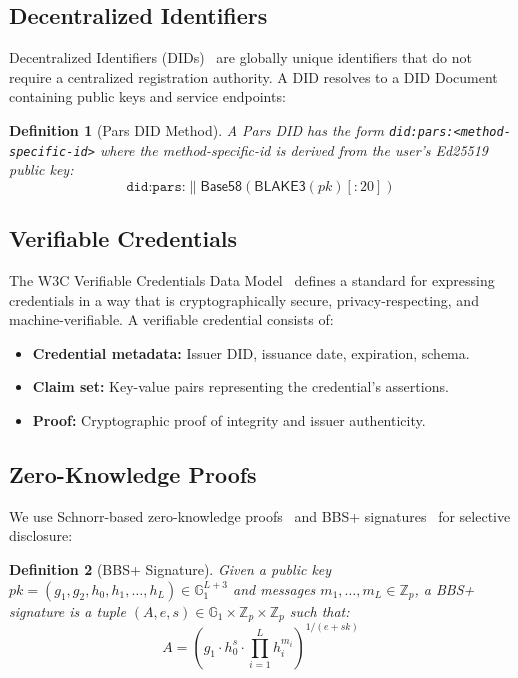 \documentclass[11pt,a4paper]{article}
\newcommand{\GG}{\mathbb{G}}
\newcommand{\ZZ}{\mathbb{Z}}
\newtheorem{definition}{Definition}
\begin{document}
\subsection{Decentralized Identifiers}

Decentralized Identifiers (DIDs)~\citep{w3c2022did} are globally unique identifiers that do not require a centralized registration authority. A DID resolves to a DID Document containing public keys and service endpoints:

\begin{definition}[Pars DID Method]
A Pars DID has the form \texttt{did:pars:<method-specific-id>} where the method-specific-id is derived from the user's Ed25519 public key:
\begin{equation}
    \texttt{did:pars:} \| \mathsf{Base58}(\mathsf{BLAKE3}(pk)[:20])
\end{equation}
\end{definition}

\subsection{Verifiable Credentials}

The W3C Verifiable Credentials Data Model~\citep{w3c2022vc} defines a standard for expressing credentials in a way that is cryptographically secure, privacy-respecting, and machine-verifiable. A verifiable credential consists of:

\begin{itemize}
    \item \textbf{Credential metadata:} Issuer DID, issuance date, expiration, schema.
    \item \textbf{Claim set:} Key-value pairs representing the credential's assertions.
    \item \textbf{Proof:} Cryptographic proof of integrity and issuer authenticity.
\end{itemize}

\subsection{Zero-Knowledge Proofs}

We use Schnorr-based zero-knowledge proofs~\citep{schnorr1991efficient} and BBS+ signatures~\citep{boneh2004bbs} for selective disclosure:

\begin{definition}[BBS+ Signature]
Given a public key $pk = (g_1, g_2, h_0, h_1, \ldots, h_L) \in \GG_1^{L+3}$ and messages $m_1, \ldots, m_L \in \ZZ_p$, a BBS+ signature is a tuple $(A, e, s) \in \GG_1 \times \ZZ_p \times \ZZ_p$ such that:
\begin{equation}
    A = \left(g_1 \cdot h_0^s \cdot \prod_{i=1}^{L} h_i^{m_i}\right)^{1/(e + sk)}
\end{equation}
\end{definition}
\end{document}
